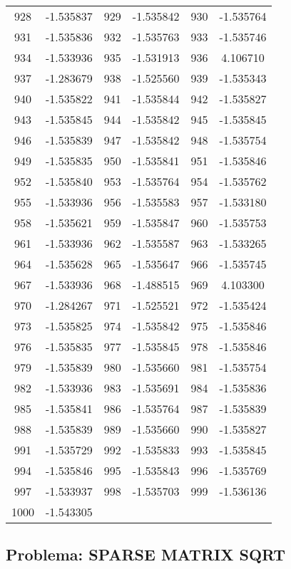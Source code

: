 \documentclass[12pt]{article}
\begin{document}
\begin{longtable}{@{}cc|cc|cc@{}}
928 & -1.535837 & 929 & -1.535842 & 930 & -1.535764 \\
931 & -1.535836 & 932 & -1.535763 & 933 & -1.535746 \\
934 & -1.533936 & 935 & -1.531913 & 936 & 4.106710 \\
937 & -1.283679 & 938 & -1.525560 & 939 & -1.535343 \\
940 & -1.535822 & 941 & -1.535844 & 942 & -1.535827 \\
943 & -1.535845 & 944 & -1.535842 & 945 & -1.535845 \\
946 & -1.535839 & 947 & -1.535842 & 948 & -1.535754 \\
949 & -1.535835 & 950 & -1.535841 & 951 & -1.535846 \\
952 & -1.535840 & 953 & -1.535764 & 954 & -1.535762 \\
955 & -1.533936 & 956 & -1.535583 & 957 & -1.533180 \\
958 & -1.535621 & 959 & -1.535847 & 960 & -1.535753 \\
961 & -1.533936 & 962 & -1.535587 & 963 & -1.533265 \\
964 & -1.535628 & 965 & -1.535647 & 966 & -1.535745 \\
967 & -1.533936 & 968 & -1.488515 & 969 & 4.103300 \\
970 & -1.284267 & 971 & -1.525521 & 972 & -1.535424 \\
973 & -1.535825 & 974 & -1.535842 & 975 & -1.535846 \\
976 & -1.535835 & 977 & -1.535845 & 978 & -1.535846 \\
979 & -1.535839 & 980 & -1.535660 & 981 & -1.535754 \\
982 & -1.533936 & 983 & -1.535691 & 984 & -1.535836 \\
985 & -1.535841 & 986 & -1.535764 & 987 & -1.535839 \\
988 & -1.535839 & 989 & -1.535660 & 990 & -1.535827 \\
991 & -1.535729 & 992 & -1.535833 & 993 & -1.535845 \\
994 & -1.535846 & 995 & -1.535843 & 996 & -1.535769 \\
997 & -1.533937 & 998 & -1.535703 & 999 & -1.536136 \\
1000 & -1.543305 &  &  &  &  \\

\end{longtable}


\newpage            
\subsection{Problema: SPARSE MATRIX SQRT}
\end{document}

